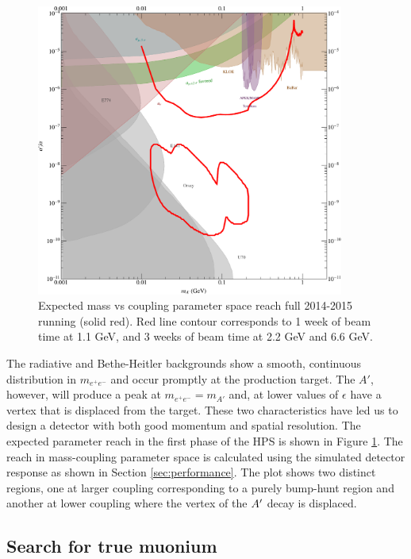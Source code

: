 \begin{figure}
\includegraphics[width=0.9\textwidth]{measurements/HPS-Proposal2014-SimpleReach.pdf}
\caption{Expected mass vs coupling parameter space reach  full 2014-2015 running (solid red). Red line contour corresponds to 1 week of beam time at 1.1 GeV, and 3 weeks of beam time at 2.2 GeV and 6.6 GeV.}
\label{fig:reach}
\end{figure}

The radiative and Bethe-Heitler backgrounds show a smooth, continuous distribution in $m_{e^+e^-}$ and occur promptly at the production target.  The $A'$, however, will produce a peak at $m_{e^+e^-}=m_{A'}$ and, at lower values of $\epsilon$ have a vertex that is displaced from the target.  These two characteristics have led us to design a detector with both good momentum and spatial resolution.    The expected parameter reach in the first phase of the HPS is shown in Figure \ref{fig:reach}. The reach in mass-coupling parameter space is calculated using the simulated detector response as shown in Section \ref{sec:performance}.  The plot shows two distinct regions,  one at larger coupling corresponding to a purely bump-hunt region and another at lower coupling where the vertex of the $A^\prime$ decay is displaced.  



\subsection{Search for true muonium}

